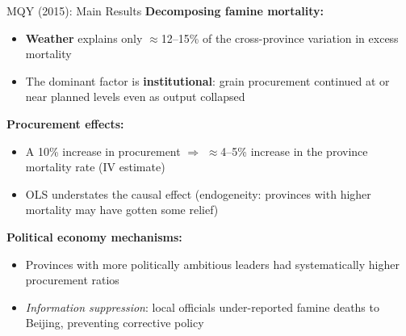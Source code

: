 \documentclass{beamer}
\begin{document}
\begin{frame}{MQY (2015): Main Results}
\textbf{Decomposing famine mortality:}
\begin{itemize}
  \item \textbf{Weather} explains only $\approx$12--15\% of the
        cross-province variation in excess mortality
  \item The dominant factor is \textbf{institutional}: grain procurement
        continued at or near planned levels even as output collapsed
\end{itemize}

\medskip
\textbf{Procurement effects:}
\begin{itemize}
  \item A 10\% increase in procurement $\Rightarrow$ $\approx$4--5\%
        increase in the province mortality rate (IV estimate)
  \item OLS understates the causal effect (endogeneity: provinces with
        higher mortality may have gotten some relief)
\end{itemize}

\medskip
\textbf{Political economy mechanisms:}
\begin{itemize}
  \item Provinces with more politically ambitious leaders had
        systematically higher procurement ratios
  \item \emph{Information suppression}: local officials under-reported
        famine deaths to Beijing, preventing corrective policy
\end{itemize}
\end{frame}
\end{document}
